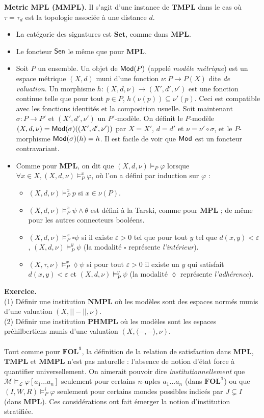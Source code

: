 \documentclass[11pt,a4paper]{report}
\newcommand{\La}{\mathcal{L}}
\newcommand{\M}{\mathcal{M}}
\newcommand{\ph}{\varphi}
\newcommand{\itemz}{\item[$\triangleright$]}
\newcommand{\gr}{\textbf}
\newcommand{\il}{\textit}
\newcommand{\info}[1]{\text{{\fontfamily{lmss}\selectfont #1}}}
\newcommand{\Mod}{\info{Mod}}
\newcommand{\Sen}{\info{Sen}}
\newcommand{\1}{\mathbbm{1}}
\begin{document}
\gr{Metric MPL (MMPL)}. Il s'agit d'une instance de $\gr{TMPL}$ dans le cas où $\tau = \tau_d$ est la topologie associée à une distance $d$.
\begin{itemize}
\itemz La catégorie des signatures est $\gr{Set}$, comme dans $\gr{MPL}$.
\itemz Le foncteur $\Sen$ le même que pour $\gr{MPL}$.
\itemz Soit $P$ un ensemble. Un objet de $\Mod(P)$ (appelé \il{modèle métrique}) est un espace métrique $(X,d)$ muni d'une fonction $\nu : P \to P(X)$ dite \il{de valuation}. Un morphisme $h : (X,d,\nu) \to (X',d',\nu')$ est une fonction continue telle que pour tout $p \in P$, $h(\nu(p)) \subseteq \nu'(p)$. Ceci est compatible avec les fonctions identités et la composition usuelle. Soit maintenant $\sigma : P \to P'$ et $(X',d',\nu')$ un $P'$-modèle. On définit le $P$-modèle $(X,d,\nu) = \Mod(\sigma)((X',d',\nu'))$ par $X = X'$, $d = d'$ et $\nu = \nu' \circ \sigma$, et le $P$-morphisme $\Mod(\sigma)(h) = h$. Il est facile de voir que $\Mod$ est un foncteur contravariant.
\itemz Comme pour $\gr{MPL}$, on dit que $(X,d,\nu) \models_P \ph$ lorsque $\forall x \in X, (X,d,\nu) \models_P^x \ph$, où l'on a défini par induction sur $\ph$ :
\begin{itemize}
\setlength\itemsep{-0.3em}
\item $(X,d,\nu) \models_P^x p$ si $x \in \nu(P)$.
\item $(X,d,\nu) \models_P^x \psi \wedge \theta$ est défini à la Tarski, comme pour $\gr{MPL}$ ; de même pour les autres connecteurs booléens.
\item $(X,d,\nu) \models_P^x \square \psi$ si il existe $\varepsilon > 0$ tel que pour tout $y$ tel que $d(x,y) < \varepsilon$, $(X,d,\nu) \models_P^y \psi$ (la modalité $\square$ représente \il{l'intérieur}).
\item $(X,\tau,\nu) \models_P^x \lozenge \psi$ si pour tout $\varepsilon > 0$ il existe un $y$ qui satisfait $d(x,y) < \varepsilon$ et $(X,d,\nu) \models_P^y \psi$ (la modalité $\lozenge$ représente \il{l'adhérence}).
\end{itemize}
\end{itemize}
\gr{Exercice.} \\ (1) Définir une institution $\gr{NMPL}$ où les modèles sont des espaces normés munis d'une valuation $(X,||-||,\nu)$. \\ (2) Définir une institution $\gr{PHMPL}$ où les modèles sont les espaces préhilbertiens munis d'une valuation $(X,\langle -, - \rangle, \nu)$. \\\\
Tout comme pour $\gr{FOL}^\gr{1}$, la définition de la relation de satisfaction dans $\gr{MPL}$, $\gr{TMPL}$ et $\gr{MMPL}$ n'est pas naturelle : l'absence de notion d'état force à quantifier universellement. On aimerait pouvoir dire \il{institutionnellement} que $\M \models_{\La} \ph[a_1...a_n]$ seulement pour certains $n$-uples $a_1...a_n$ (dans $\gr{FOL}^\gr{1}$) ou que $(I,W,R) \models_P^i \ph$ seulement pour certains mondes possibles indicés par $J \subsetneq I$ (dans $\gr{MPL}$). Ces considérations ont fait émerger la notion d'institution stratifiée.
\newpage
\end{document}
